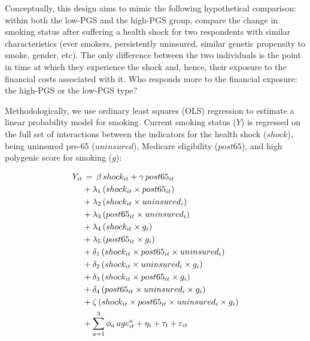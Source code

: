 \documentclass[11pt]{article}
\begin{document}
Conceptually, this design aims to mimic the following hypothetical comparison: within both the low-PGS and the high-PGS group, compare the change in smoking status after suffering a health shock for two respondents with similar characteristics (ever smokers, persistently uninsured, similar genetic propensity to smoke, gender, etc).
The only difference between the two individuals is the point in time at which they experience the shock and, hence, their exposure to the financial costs associated with it.
Who responds more to the financial exposure: the high-PGS or the low-PGS type?

Methodologically, we use ordinary least squares (OLS) regression to estimate a linear probability model for smoking.
Current smoking status ($Y$) is regressed on the full set of interactions between the indicators for the health shock ($shock$), being uninsured pre-65 ($uninsured$), Medicare eligibility ($post65$), and high polygenic score for smoking ($g$):

\begin{align} \label{eq:regression}
Y_{it}& \thinspace  = \thinspace
				\beta \thinspace shock_{it} + \gamma \thinspace post65_{it} \\
				&+\lambda_1 \thinspace  (shock_{it} \times post65_{it}) \nonumber \\
				&+ \lambda_2 \thinspace (shock_{it} \times uninsured_i) \nonumber \\
				&+\lambda_3  \thinspace (post65_{it} \times uninsured_i) \nonumber \\
				&+ \lambda_4 \thinspace (shock_{it} \times g_i) \nonumber \\
				&+\lambda_5 \thinspace (post65_{it} \times g_i) \nonumber \\
				&+ \delta_1 \thinspace (shock_{it} \times post65_{it} \times uninsured_i) \nonumber \\
				&+ \delta_2 \thinspace (shock_{it} \times uninsured_i \times g_i) \nonumber \\
				&+ \delta_3 \thinspace (shock_{it} \times post65_{it} \times g_i) \nonumber \\
				&+ \delta_4 \thinspace (post65_{it} \times uninsured_i \times g_i) \nonumber\\
				&+ \zeta \thinspace (shock_{it} \times post65_{it} \times uninsured_i \times g_i) \nonumber \\
				&+ \sum_{a=1}^3 \phi_a \thinspace age_{it}^{a} + \eta_i + \tau_t + \varepsilon_{it} \nonumber
\end{align}
\end{document}
